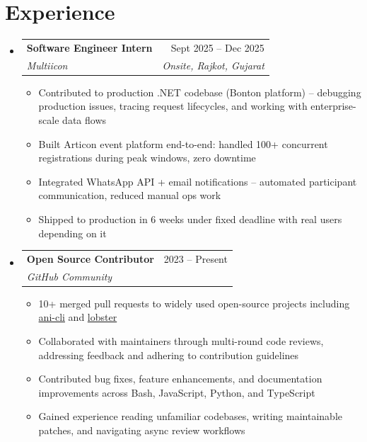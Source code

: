 \documentclass[11pt,a4paper]{article}
\makeatletter
\newcommand{\resumeSubheading}[4]{
  \vspace{-1pt}\item
    \begin{tabular*}{0.97\textwidth}[t]{l@{\extracolsep{\fill}}r}
      \textbf{#1} & #2 \\
      \textit{#3} & \textit{#4} \\
    \end{tabular*}\vspace{-3pt}
}
\newcommand{\resumeItem}[1]{
  \item\small{#1 \vspace{-1pt}}
}
\makeatother
\begin{document}
\section{Experience}
\begin{itemize}[leftmargin=*]
\resumeSubheading
{Software Engineer Intern}{Sept 2025 -- Dec 2025}
{Multiicon}{Onsite, Rajkot, Gujarat}
\begin{itemize}[leftmargin=*]
\resumeItem{Contributed to production .NET codebase (Bonton platform) -- debugging production issues, tracing request lifecycles, and working with enterprise-scale data flows}
\resumeItem{Built Articon event platform end-to-end: handled 100+ concurrent registrations during peak windows, zero downtime}
\resumeItem{Integrated WhatsApp API + email notifications -- automated participant communication, reduced manual ops work}
\resumeItem{Shipped to production in 6 weeks under fixed deadline with real users depending on it}
\end{itemize}

\resumeSubheading
{Open Source Contributor}{2023 -- Present}
{GitHub Community}{}
\begin{itemize}[leftmargin=*]
\resumeItem{10+ merged pull requests to widely used open-source projects including \href{https://github.com/pystardust/ani-cli}{ani-cli} and \href{https://github.com/justchokingaround/lobster}{lobster}}
\resumeItem{Collaborated with maintainers through multi-round code reviews, addressing feedback and adhering to contribution guidelines}
\resumeItem{Contributed bug fixes, feature enhancements, and documentation improvements across Bash, JavaScript, Python, and TypeScript}
\resumeItem{Gained experience reading unfamiliar codebases, writing maintainable patches, and navigating async review workflows}
\end{itemize}
\end{itemize}

\end{document}

